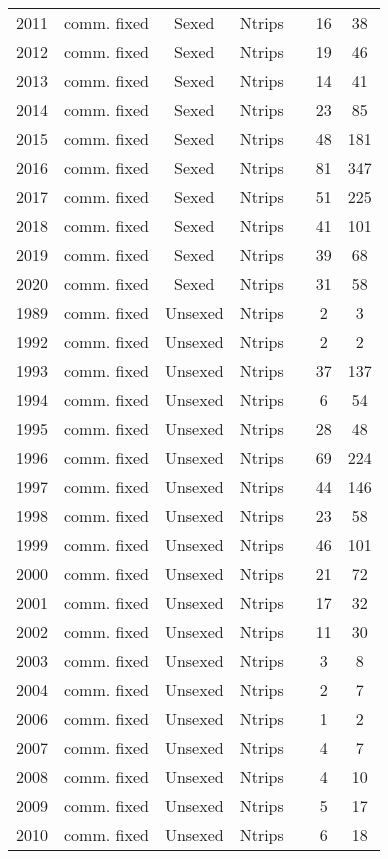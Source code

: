\begin{longtable}[t]{c>{\centering\arraybackslash}p{3cm}ccccc}
2011 & comm. fixed & Sexed & Ntrips &  & 16 & 38\\
2012 & comm. fixed & Sexed & Ntrips &  & 19 & 46\\
2013 & comm. fixed & Sexed & Ntrips &  & 14 & 41\\
2014 & comm. fixed & Sexed & Ntrips &  & 23 & 85\\
2015 & comm. fixed & Sexed & Ntrips &  & 48 & 181\\
2016 & comm. fixed & Sexed & Ntrips &  & 81 & 347\\
2017 & comm. fixed & Sexed & Ntrips &  & 51 & 225\\
2018 & comm. fixed & Sexed & Ntrips &  & 41 & 101\\
2019 & comm. fixed & Sexed & Ntrips &  & 39 & 68\\
2020 & comm. fixed & Sexed & Ntrips &  & 31 & 58\\
1989 & comm. fixed & Unsexed & Ntrips &  & 2 & 3\\
1992 & comm. fixed & Unsexed & Ntrips &  & 2 & 2\\
1993 & comm. fixed & Unsexed & Ntrips &  & 37 & 137\\
1994 & comm. fixed & Unsexed & Ntrips &  & 6 & 54\\
1995 & comm. fixed & Unsexed & Ntrips &  & 28 & 48\\
1996 & comm. fixed & Unsexed & Ntrips &  & 69 & 224\\
1997 & comm. fixed & Unsexed & Ntrips &  & 44 & 146\\
1998 & comm. fixed & Unsexed & Ntrips &  & 23 & 58\\
1999 & comm. fixed & Unsexed & Ntrips &  & 46 & 101\\
2000 & comm. fixed & Unsexed & Ntrips &  & 21 & 72\\
2001 & comm. fixed & Unsexed & Ntrips &  & 17 & 32\\
2002 & comm. fixed & Unsexed & Ntrips &  & 11 & 30\\
2003 & comm. fixed & Unsexed & Ntrips &  & 3 & 8\\
2004 & comm. fixed & Unsexed & Ntrips &  & 2 & 7\\
2006 & comm. fixed & Unsexed & Ntrips &  & 1 & 2\\
2007 & comm. fixed & Unsexed & Ntrips &  & 4 & 7\\
2008 & comm. fixed & Unsexed & Ntrips &  & 4 & 10\\
2009 & comm. fixed & Unsexed & Ntrips &  & 5 & 17\\
2010 & comm. fixed & Unsexed & Ntrips &  & 6 & 18\\

\end{longtable}
